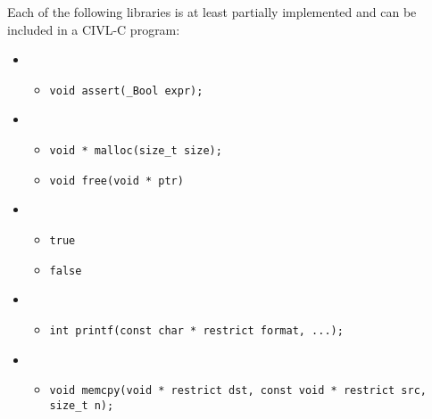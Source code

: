 Each of the following libraries is at least partially implemented and can
be included in a CIVL-C program:
\begin{itemize}
\item {}
  \begin{itemize}
  \item \verb!void assert(_Bool expr);!
  \end{itemize}
\item {}
  \begin{itemize}
  \item \verb!void * malloc(size_t size);!
  \item \verb!void free(void * ptr)!
  \end{itemize}
\item {}
  \begin{itemize}
  \item \verb!true!
  \item \verb!false!
  \end{itemize}
\item {}
  \begin{itemize}
  \item \verb!int printf(const char * restrict format, ...);!
  \end{itemize}
\item {}
  \begin{itemize}
  \item \verb!void memcpy(void * restrict dst, const void * restrict src, size_t n);!
  \end{itemize}
\end{itemize}
